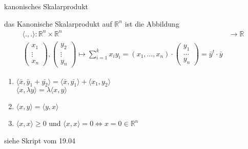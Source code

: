 \documentclass[class=article, crop=false]{standalone}
\begin{document}
\begin{zettel}{kanonisches Skalarprodukt}
\begin{flashcard}
    \begin{definition}[Skalarprodukt]
        das Kanonische Skalarprodukt auf $\mathbb{R}^n $  ist die Abbildung 
        \begin{align*}
            \langle .,.\rangle : \mathbb{R}^n \times \mathbb{R}^n  &\longrightarrow \mathbb{R}\\
            \begin{pmatrix}x_1\\ \vdots\\ x_n\end{pmatrix}, \begin{pmatrix}y_2\\ \vdots\\ y_n\end{pmatrix}  \mapsto \sum_{i = 1}^{k} x_i  y_i  = (x_1 , \dots , x_n ) \cdot \begin{pmatrix}y_1\\ \dots\\ y_n\end{pmatrix}  = \bar{y}^t \cdot \bar{y} 
        \end{align*}
    \end{definition}
\end{flashcard}
\begin{enumerate}
    \item $ \langle \bar{x},\bar{y}_1+\bar{y_2}\rangle  = \langle \bar{x},\bar{y_1}\rangle + \langle x_1,y_2\rangle $\\
        $ \langle x,\lambda y \rangle = \lambda \langle x,y\rangle $
            \item $ \langle x,y\rangle = \langle y,x\rangle $ 
                \item $ \langle x,x\rangle \geq 0 $ und $ \langle x,x\rangle  = 0 \iff  x = 0 \in  \mathbb{R}^n$ 
\end{enumerate}
\begin{definition}
    siehe Skript vom 19.04
\end{definition}
\end{zettel}
\end{document}
